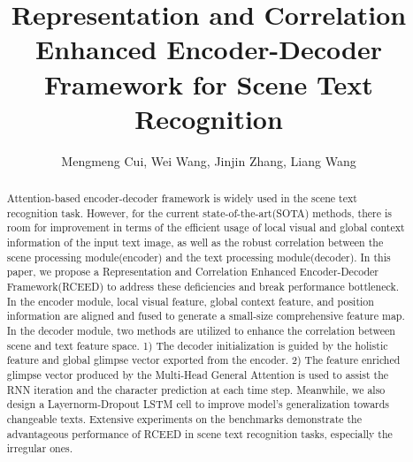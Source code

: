 \documentclass[runningheads]{llncs}
\begin{document}
\title{Representation and Correlation Enhanced Encoder-Decoder Framework for Scene Text Recognition}
\author{Mengmeng Cui, Wei Wang, Jinjin Zhang, Liang Wang}
\authorrunning{}
\maketitle              \begin{abstract}
Attention-based encoder-decoder framework is widely used in the scene text recognition task. However, for the current state-of-the-art(SOTA) methods, there is room for improvement in terms of the efficient usage of local visual and global context information of the input text image, as well as the robust correlation between the scene processing module(encoder) and the text processing module(decoder). In this paper, we propose a Representation and Correlation Enhanced Encoder-Decoder Framework(RCEED) to address these deficiencies and break performance bottleneck. In the encoder module, local visual feature, global context feature, and position information are aligned and fused to generate a small-size comprehensive feature map. In the decoder module, two methods are utilized to enhance the correlation between scene and text feature space. 1) The decoder initialization is guided by the holistic feature and global glimpse vector exported from the encoder. 2) The feature enriched glimpse vector produced by the Multi-Head General Attention is used to assist the RNN iteration and the character prediction at each time step. Meanwhile, we also design a Layernorm-Dropout LSTM cell to improve model's generalization towards changeable texts. Extensive experiments on the benchmarks demonstrate the advantageous performance of RCEED in scene text recognition tasks, especially the irregular ones. 
\end{abstract}
\end{document}
